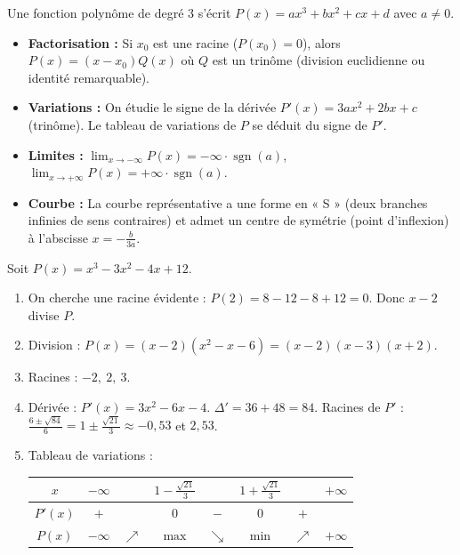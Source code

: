 \documentclass[11pt]{article}
\begin{document}
\begin{propriete}
Une fonction polynôme de degré 3 s'écrit $P(x) = ax^3+bx^2+cx+d$ avec $a \neq 0$.
\begin{itemize}
    \item \textbf{Factorisation :} Si $x_0$ est une racine ($P(x_0)=0$), alors $P(x) = (x-x_0)Q(x)$ où $Q$ est un trinôme (division euclidienne ou identité remarquable).
    \item \textbf{Variations :} On étudie le signe de la dérivée $P'(x) = 3ax^2+2bx+c$ (trinôme). Le tableau de variations de $P$ se déduit du signe de $P'$.
    \item \textbf{Limites :} $\lim_{x \to -\infty} P(x) = -\infty \cdot \operatorname{sgn}(a)$, $\lim_{x \to +\infty} P(x) = +\infty \cdot \operatorname{sgn}(a)$.
    \item \textbf{Courbe :} La courbe représentative a une forme en « S » (deux branches infinies de sens contraires) et admet un centre de symétrie (point d'inflexion) à l'abscisse $x = -\frac{b}{3a}$.
\end{itemize}
\end{propriete}

\begin{exemplebox}
Soit $P(x) = x^3 - 3x^2 - 4x + 12$.
\begin{enumerate}
    \item On cherche une racine évidente : $P(2) = 8 - 12 - 8 + 12 = 0$. Donc $x-2$ divise $P$.
    \item Division : $P(x) = (x-2)(x^2 - x - 6) = (x-2)(x-3)(x+2)$.
    \item Racines : $-2,\ 2,\ 3$.
    \item Dérivée : $P'(x) = 3x^2 - 6x - 4$. $\Delta' = 36 + 48 = 84$. Racines de $P'$ : $\frac{6 \pm \sqrt{84}}{6} = 1 \pm \frac{\sqrt{21}}{3} \approx -0,53$ et $2,53$.
    \item Tableau de variations :
    \begin{center}
    \begin{tabular}{|c|ccccccc|}\hline
    $x$ & $-\infty$ & & $1-\frac{\sqrt{21}}{3}$ & & $1+\frac{\sqrt{21}}{3}$ & & $+\infty$ \\ \hline
    $P'(x)$ & $+$ & & $0$ & $-$ & $0$ & $+$ & \\ \hline
    $P(x)$ & $-\infty$ & $\nearrow$ & $\text{max}$ & $\searrow$ & $\text{min}$ & $\nearrow$ & $+\infty$ \\ \hline
    \end{tabular}
    \end{center}
\end{enumerate}
\end{exemplebox}
\end{document}
